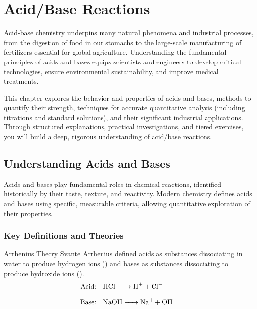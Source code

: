 \chapter{Acid/Base Reactions}

Acid-base chemistry underpins many natural phenomena and industrial processes, from the digestion of food in our stomachs to the large-scale manufacturing of fertilizers essential for global agriculture. Understanding the fundamental principles of acids and bases equips scientists and engineers to develop critical technologies, ensure environmental sustainability, and improve medical treatments.

This chapter explores the behavior and properties of acids and bases, methods to quantify their strength, techniques for accurate quantitative analysis (including titrations and standard solutions), and their significant industrial applications. Through structured explanations, practical investigations, and tiered exercises, you will build a deep, rigorous understanding of acid/base reactions.

\section{Understanding Acids and Bases}
\FloatBarrier
\FloatBarrier
\FloatBarrier
{}

Acids and bases play fundamental roles in chemical reactions, identified historically by their taste, texture, and reactivity. Modern chemistry defines acids and bases using specific, measurable criteria, allowing quantitative exploration of their properties.

\subsection{Key Definitions and Theories}
\FloatBarrier
\FloatBarrier
\FloatBarrier

\begin{keyconcept}{Arrhenius Theory}
Svante Arrhenius defined acids as substances dissociating in water to produce hydrogen ions () and bases as substances dissociating to produce hydroxide ions ().
\begin{align*}
\text{Acid:}\quad &\ce{HCl -> H+ + Cl-}\\[6pt]
\text{Base:}\quad &\ce{NaOH -> Na+ + OH-}
\end{align*}
\end{keyconcept}

